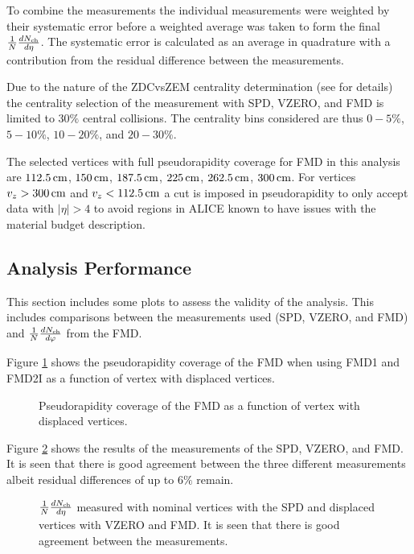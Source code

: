 \documentclass[11pt]{article}
\begin{document}
To combine the measurements the individual measurements were weighted
by their systematic error before a weighted average was taken to form
the final $\dndeta$. The systematic error is calculated as an average
in quadrature with a contribution from the residual difference between
the measurements.

Due to the nature of the ZDCvsZEM centrality determination (see
\cite{maxime} for details) the centrality selection of the measurement
with SPD, VZERO, and FMD is limited to $30\%$ central collisions. The
centrality bins considered are thus $0-5\%$, $5-10\%$, $10-20\%$, and
$20-30\%$.

The selected vertices with full pseudorapidity coverage for FMD in
this analysis are $\cm{112.5}$, $\cm{150}$, $\cm{187.5}$, $\cm{225}$,
$\cm{262.5}$, $\cm{300}$. For vertices $v_z > \cm{300}$ and $v_z <
\cm{112.5}$ a cut is imposed in pseudorapidity to only accept data
with $|\eta| > 4$ to avoid regions in ALICE known to have issues with
the material budget description.

\subsection{Analysis Performance}

This section includes some plots to assess the validity of the
analysis. This includes comparisons between the measurements used
(SPD, VZERO, and FMD) and $\dndphi$ from the FMD.

Figure \ref{coverage} shows the pseudorapidity coverage of the FMD
when using FMD1 and FMD2I as a function of vertex with displaced
vertices.
\begin{figure}[hbp]
  \centering
  \caption{Pseudorapidity coverage of the FMD as a function of vertex
    with displaced vertices.}
  \label{coverage}
\end{figure} 

Figure \ref{spdfmdvzero} shows the results of the measurements of the
SPD, VZERO, and FMD. It is seen that there is good agreement between
the three different measurements albeit residual differences of up to
$6 \%$ remain.
\begin{figure}[hbp]
   \centering
  \caption{$\dndeta$ measured with nominal vertices with the SPD and
    displaced vertices with VZERO and FMD. It is seen that there is
    good agreement between the measurements.}
  \label{spdfmdvzero}
\end{figure} 
\end{document}
